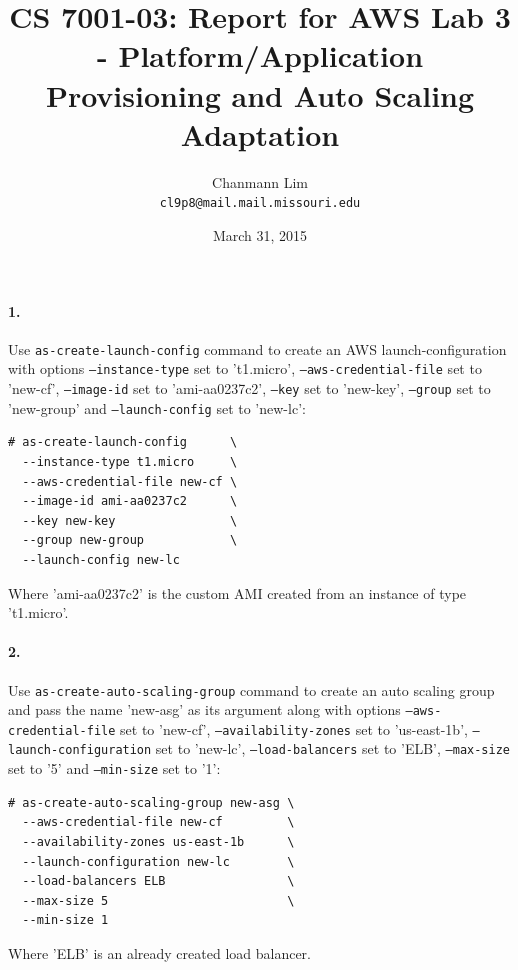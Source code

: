 \documentclass[a4paper]{article}
\begin{document}
\title{CS 7001-03: Report for AWS Lab 3 - Platform/Application Provisioning and Auto Scaling Adaptation}
\author{Chanmann Lim\\ 
	\texttt{cl9p8@mail.mail.missouri.edu}}
\date{March 31, 2015}
\maketitle

\paragraph{1. } Use \texttt{as-create-launch-config} command to create an AWS launch-configuration with options \texttt{--instance-type} set to 't1.micro', \texttt{--aws-credential-file} set to 'new-cf', \texttt{--image-id} set to 'ami-aa0237c2', \texttt{--key} set to 'new-key', \texttt{--group} set to 'new-group' and \texttt{--launch-config} set to 'new-lc':

\begin{verbatim}
# as-create-launch-config      \
  --instance-type t1.micro     \
  --aws-credential-file new-cf \
  --image-id ami-aa0237c2      \
  --key new-key                \
  --group new-group            \
  --launch-config new-lc
\end{verbatim}
Where 'ami-aa0237c2' is the custom AMI created from an instance of type 't1.micro'.

\paragraph{2. } Use \texttt{as-create-auto-scaling-group} command to create an auto scaling group and pass the name 'new-asg' as its argument along with options \texttt{--aws-credential-file} set to 'new-cf', \texttt{--availability-zones} set to 'us-east-1b', \texttt{--launch-configuration} set to 'new-lc', \texttt{--load-balancers} set to 'ELB', \texttt{--max-size} set to '5' and \texttt{--min-size} set to '1':

\begin{verbatim}
# as-create-auto-scaling-group new-asg \
  --aws-credential-file new-cf         \
  --availability-zones us-east-1b      \
  --launch-configuration new-lc        \
  --load-balancers ELB                 \
  --max-size 5                         \
  --min-size 1
\end{verbatim}
Where 'ELB' is an already created load balancer.
\end{document}
